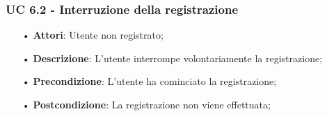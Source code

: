 \subsubsection{UC 6.2 - Interruzione della registrazione}
\begin{itemize}
\item[•]\textbf{Attori}: Utente non registrato;
\item[•]\textbf{Descrizione}: L’utente interrompe volontariamente la registrazione;
\item[•]\textbf{Precondizione}: L’utente ha cominciato la registrazione;
\item[•]\textbf{Postcondizione}: La registrazione non viene effettuata;
\end{itemize}
